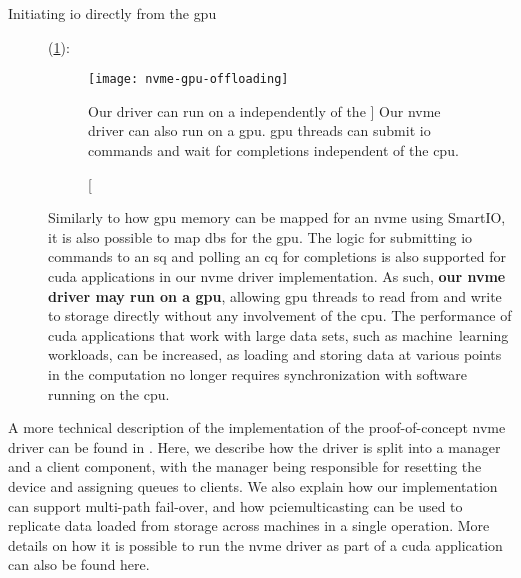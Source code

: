 \begin{description}
    \item[Initiating \gls{io} directly from the \gls{gpu}] (\cref{fig:nvme-gpu-offloading}):
\begin{figure}
    \centering
    \texttt{[image: nvme-gpu-offloading]}
    \caption
    [Our  driver can run on a  independently of the ]
    {Our \gls{nvme} driver can also run on a \gls{gpu}. \Gls{gpu} threads can submit \gls{io} commands and wait for completions independent of the \gls{cpu}.}
    \label{fig:nvme-gpu-offloading}
\end{figure}
        Similarly to how \gls{gpu} memory can be mapped for an \gls{nvme} using SmartIO, it is also possible to map \glspl{db} for the \gls{gpu}.
        The logic for submitting \gls{io} commands to an \gls{sq} and polling an \gls{cq} for completions is also supported for \gls{cuda} applications in our \gls{nvme} driver implementation.
        As such, \textbf{our \gls{nvme} driver may run on a \gls{gpu}}, allowing \gls{gpu} threads to read from and write to storage directly without any involvement of the \gls{cpu}.
        The performance of \gls{cuda} applications that work with large data sets, such as machine~learning workloads, can be increased, as loading and storing data at various points in the computation no longer requires synchronization with software running on the \gls{cpu}.
        

\end{description}


A more technical description of the implementation of the proof-of-concept \gls{nvme} driver can be found in .
%
Here, we describe how the driver is split into a manager and a client component, with the manager being responsible for resetting the device and assigning queues to clients.
%
We also explain how our implementation can support multi-path fail-over, and how \gls{pciemulticasting} can be used to replicate data loaded from storage across machines in a single operation.
%
More details on how it is possible to run the \gls{nvme} driver as part of a \gls{cuda} application can also be found here.



